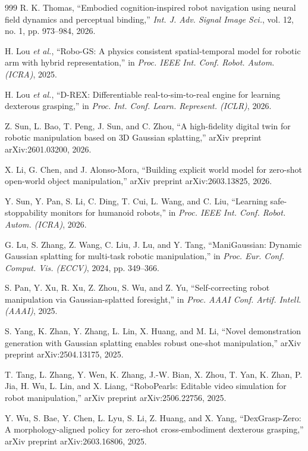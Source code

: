 ﻿\documentclass[11pt,a4paper]{article}
\begin{document}
\begin{thebibliography}{999}
R. K. Thomas, ``Embodied cognition-inspired robot navigation using neural field dynamics and perceptual binding,'' \textit{Int. J. Adv. Signal Image Sci.}, vol. 12, no. 1, pp. 973--984, 2026.

H. Lou \textit{et al.}, ``{Robo-GS}: A physics consistent spatial-temporal model for robotic arm with hybrid representation,'' in \textit{Proc. IEEE Int. Conf. Robot. Autom. (ICRA)}, 2025.

H. Lou \textit{et al.}, ``D-REX: Differentiable real-to-sim-to-real engine for learning dexterous grasping,'' in \textit{Proc. Int. Conf. Learn. Represent. (ICLR)}, 2026.

Z. Sun, L. Bao, T. Peng, J. Sun, and C. Zhou, ``A high-fidelity digital twin for robotic manipulation based on {3D} Gaussian splatting,'' arXiv preprint arXiv:2601.03200, 2026.

X. Li, G. Chen, and J. Alonso-Mora, ``Building explicit world model for zero-shot open-world object manipulation,'' arXiv preprint arXiv:2603.13825, 2026.

Y. Sun, Y. Pan, S. Li, C. Ding, T. Cui, L. Wang, and C. Liu, ``Learning safe-stoppability monitors for humanoid robots,'' in \textit{Proc. IEEE Int. Conf. Robot. Autom. (ICRA)}, 2026.

G. Lu, S. Zhang, Z. Wang, C. Liu, J. Lu, and Y. Tang, ``{ManiGaussian}: Dynamic Gaussian splatting for multi-task robotic manipulation,'' in \textit{Proc. Eur. Conf. Comput. Vis. (ECCV)}, 2024, pp. 349--366.

S. Pan, Y. Xu, R. Xu, Z. Zhou, S. Wu, and Z. Yu, ``Self-correcting robot manipulation via Gaussian-splatted foresight,'' in \textit{Proc. AAAI Conf. Artif. Intell. (AAAI)}, 2025.

S. Yang, K. Zhan, Y. Zhang, L. Lin, X. Huang, and M. Li, ``Novel demonstration generation with Gaussian splatting enables robust one-shot manipulation,'' arXiv preprint arXiv:2504.13175, 2025.

T. Tang, L. Zhang, Y. Wen, K. Zhang, J.-W. Bian, X. Zhou, T. Yan, K. Zhan, P. Jia, H. Wu, L. Lin, and X. Liang, ``{RoboPearls}: Editable video simulation for robot manipulation,'' arXiv preprint arXiv:2506.22756, 2025.

Y. Wu, S. Bae, Y. Chen, L. Lyu, S. Li, Z. Huang, and X. Yang, ``{DexGrasp-Zero}: A morphology-aligned policy for zero-shot cross-embodiment dexterous grasping,'' arXiv preprint arXiv:2603.16806, 2025.


\end{thebibliography}
\end{document}
